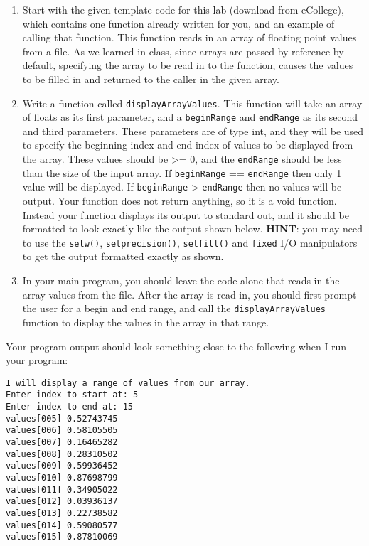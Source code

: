 \documentclass[11pt]{article}
\begin{document}
\begin{enumerate}
\item Start with the given template code for this lab (download from
   eCollege), which contains one function already written for you, and
   an example of calling that function.  This function reads in an
   array of floating point values from a file.  As we learned in
   class, since arrays are passed by reference by default, specifying
   the array to be read in to the function, causes the values to be
   filled in and returned to the caller in the given array.
\item Write a function called \verb~displayArrayValues~.  This function will
   take an array of floats as its first parameter, and a \verb~beginRange~
   and \verb~endRange~ as its second and third parameters.  These
   parameters are of type int, and they will be used to specify the
   beginning index and end index of values to be displayed from the
   array.  These values should be >= 0, and the \verb~endRange~ should be
   less than the size of the input array.  If \verb~beginRange~ ==
   \verb~endRange~ then only 1 value will be displayed.  If \verb~beginRange~ >
   \verb~endRange~ then no values will be output. Your function does not
   return anything, so it is a void function.  Instead your function
   displays its output to standard out, and it should be formatted to
   look exactly like the output shown below.  \textbf{HINT}: you may need to
   use the \verb~setw()~, \verb~setprecision()~, \verb~setfill()~ and \verb~fixed~ I/O
   manipulators to get the output formatted exactly as shown.
\item In your main program, you should leave the code alone that reads in
   the array values from the file.  After the array is read in, you
   should first prompt the user for a begin and end range, and call
   the \verb~displayArrayValues~ function to display the values in the
   array in that range.
\end{enumerate}

Your program output should look something close to the following when I
run your program:


\begin{verbatim}
I will display a range of values from our array.
Enter index to start at: 5
Enter index to end at: 15
values[005] 0.52743745
values[006] 0.58105505
values[007] 0.16465282
values[008] 0.28310502
values[009] 0.59936452
values[010] 0.87698799
values[011] 0.34905022
values[012] 0.03936137
values[013] 0.22738582
values[014] 0.59080577
values[015] 0.87810069
\end{verbatim}
\end{document}
